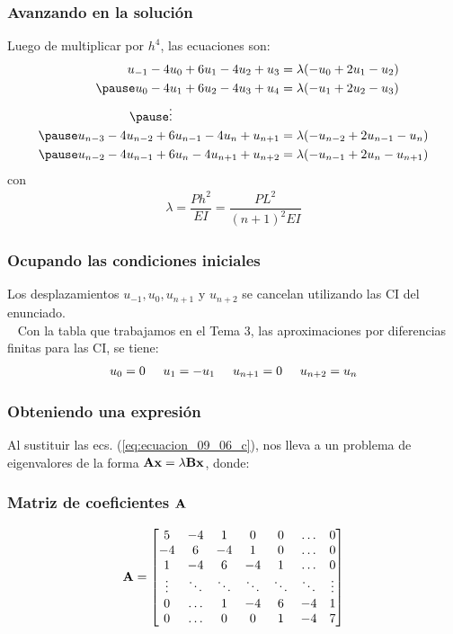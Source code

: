 \documentclass[12pt]{beamer}
\begin{document}
\begin{frame}
\frametitle{Avanzando en la solución}
Luego de multiplicar por $h^{4}$, las ecuaciones son:
\pause
\begin{eqnarray}
\begin{aligned}
u_{-1} - 4 u_{0} + 6 u_{1} - 4 u_{2} + u_{3} &= \lambda (-u_{0} + 2 u_{1} - u_{2}) \\ \pause
u_{0} - 4 u_{1} + 6 u_{2} - 4 u_{3} + u_{4} &= \lambda (-u_{1} + 2 u_{2} - u_{3}) \\ \pause 
\vdots \hspace{3cm} &{} \\ \pause
u_{n-3} - 4 u_{n-2} + 6 u_{n-1} - 4 u_{n} + u_{n+1} &= \lambda (-u_{n-2} + 2 u_{n-1} - u_{n}) \\ \pause 
u_{n-2} - 4 u_{n-1} + 6 u_{n} - 4 u_{n+1} + u_{n+2} &= \lambda (-u_{n-1} + 2 u_{n} - u_{n+1})
\end{aligned}
\label{eq:ecuacion_09_06_c}
\end{eqnarray}
\pause
con
\begin{align*}
\lambda = \dfrac{P h^{2}}{E I} = \dfrac{P L^{2}}{(n + 1)^{2} E I}
\end{align*}
\end{frame}
\begin{frame}
\frametitle{Ocupando las condiciones iniciales}
Los desplazamientos $u_{-1}, u_{0}, u_{n+1}$ y $u_{n+2}$ se cancelan utilizando las CI del enunciado.
\\
\bigskip\
\pause
Con la tabla que trabajamos en el Tema 3, las aproximaciones por diferencias finitas para las CI, se tiene:
\begin{align*}
u_{0} = 0\hspace{0.5cm} u_{1} = - u_{1} \hspace{0.5cm} u_{n+1} = 0 \hspace{0.5cm} u_{n+2} = u_{n}
\end{align*}
\end{frame}
\begin{frame}
\frametitle{Obteniendo una expresión}
Al sustituir las ecs. (\ref{eq:ecuacion_09_06_c}), nos lleva a un problema de eigenvalores de la forma $\vb{A x} = \lambda \vb{B x}$, donde:
\end{frame}
\begin{frame}
\frametitle{Matriz de coeficientes $\vb{A}$}
\renewcommand{\arraystretch}{1}
\begin{align*}
\vb{A} =
\begin{bmatrix}
5 & -4 & 1 & 0 & 0 & \ldots & 0 \\
-4 & 6 & -4 & 1 & 0 & \ldots & 0 \\
1 & -4 & 6 & -4 & 1 & \ldots & 0 \\
\vdots & \ddots & \ddots & \ddots & \ddots & \ddots & \vdots \\
0 & \ldots & 1 & -4 & 6 & -4 & 1 \\    
0 & \ldots & 0 & 0 & 1 & -4 & 7    
\end{bmatrix}
\end{align*}
\end{frame}
\end{document}
